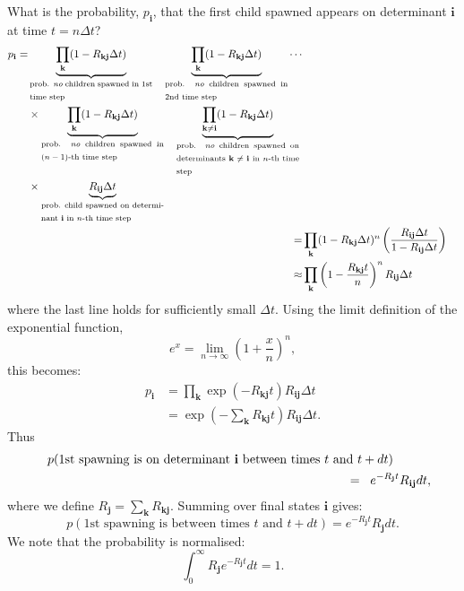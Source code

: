 \documentclass[a4paper, 11pt]{article}
\newcommand{\bi}{\mathbf{i}}
\newcommand{\bj}{\mathbf{j}}
\newcommand{\bk}{\mathbf{k}}
\begin{document}
What is the probability, $p_\bi$, that the first child spawned appears on determinant $\bi$ at time $t=n\Delta t$?
\begin{align}
\begin{split}
p_\bi =& 
\underbrace{\prod_{\bk} (1-R_{\bk\bj}\Delta t)}_{\textrm{\parbox{4cm}{prob. \emph{no} children spawned in 1st time step}}}
\quad\underbrace{\prod_{\bk} (1-R_{\bk\bj}\Delta t)}_{\textrm{\parbox{4cm}{prob. \emph{no} children spawned in 2nd time step}}}
\cdots \\
& \times \underbrace{\prod_{\bk} (1-R_{\bk\bj}\Delta t)}_{\textrm{\parbox{4cm}{prob. \emph{no} children spawned in $(n-1)$-th time step}}} 
\quad\underbrace{\prod_{\bk\neq\bi} (1-R_{\bk\bj}\Delta t)}_{\textrm{\parbox{4cm}{prob. \emph{no} children spawned on determinants $\bk\neq\bi$ in $n$-th time step}}} \\
& \times \underbrace{R_{\bi\bj}\Delta t}_{\textrm{\parbox{4cm}{prob. child spawned on determinant $\bi$ in $n$-th time step}}}
\end{split} \\
\hphantom{p}=& \prod_{\bk} (1-R_{\bk\bj}\Delta t)^n \left(\frac{R_{\bi\bj}\Delta t}{1-R_{\bi\bj}\Delta t}\right) \\
\hphantom{p}\approx& \prod_{\bk} \left(1-\frac{R_{\bk\bj}t}{n}\right)^n R_{\bi\bj}\Delta t
\end{align}
where the last line holds for sufficiently small $\Delta t$.  Using the limit definition of the exponential function, 
\begin{equation}
e^x = \lim_{n\to\infty} \left(1+\frac{x}{n}\right)^n,
\end{equation}
this becomes:
\begin{align}
p_\bi &= \prod_{\bk} \exp\left(-R_{\bk\bj}t\right) R_{\bi\bj}\Delta t \\
  &= \exp\left(-\sum_\bk R_{\bk\bj}t\right)  R_{\bi\bj}\Delta t.
\end{align}
Thus
\begin{eqnarray}
& & p(\textrm{1st spawning is on determinant $\bi$ between times $t$ and
 $t+dt$}) \hspace*{3em} \\\nonumber
&& \quad = \;\; e^{-R_{\bj}t} R_{\bi\bj} dt,
\end{eqnarray}
where we define $R_\bj=\sum_\bk R_{\bk\bj}$. Summing over final states
$\bi$ gives:
\begin{equation}
p(\textrm{1st spawning is between times $t$ and $t+dt$}) = e^{-R_\bj t} R_\bj dt.
\end{equation}
We note that the probability is normalised:
\begin{equation}
\int_0^\infty R_\bj e^{-R_\bj t} dt = 1.
\end{equation}
\end{document}
